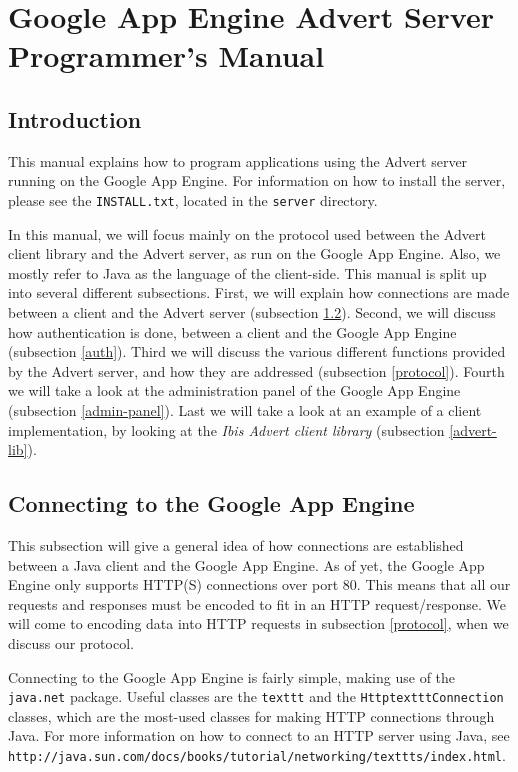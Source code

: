 \section{Google App Engine Advert Server Programmer's Manual}
\subsection{Introduction}
\label{introduction}
This manual explains how to program applications using the Advert server running
on the Google App Engine. For information on how to install the server, please
see the \texttt{INSTALL.txt}, located in the \texttt{server} directory.

In this manual, we will focus mainly on the protocol used between the Advert
client library and the Advert server, as run on the Google App Engine. Also, we
mostly refer to Java as the language of the client-side. This manual is split up into
several different subsections. First, we will explain how connections are made
between a client and the Advert server (subsection \ref{http-java}). Second, we
will
discuss how authentication is done, between a client and the Google App Engine
(subsection \ref{auth}). Third we will discuss the various different functions
provided by the Advert server, and how they are addressed (subsection
\ref{protocol}). Fourth we will take a look at the administration panel of the
Google App Engine (subsection \ref{admin-panel}). Last we will take a look at an
example of a client implementation, by looking at the \emph{Ibis Advert
client library} (subsection \ref{advert-lib}).

\subsection{Connecting to the Google App Engine}
\label{http-java}
This subsection will give a general idea of how connections are established
between a Java client and the Google App Engine. As of yet, the Google App
Engine only supports HTTP(S) connections over port 80. This means that all our
requests and responses must be encoded to fit in an HTTP request/response. We
will come to encoding data into HTTP requests in subsection \ref{protocol}, when
we discuss our protocol.

Connecting to the Google App Engine is fairly simple, making use of the
\texttt{java.net} package. Useful classes are the \texttt{texttt} and the
\texttt{HttptextttConnection} classes, which are the most-used classes for making
HTTP connections through Java. For more information on how to connect to an
HTTP server using Java, see
\texttt{http://java.sun.com/docs/books/tutorial/networking/texttts/index.html}.


